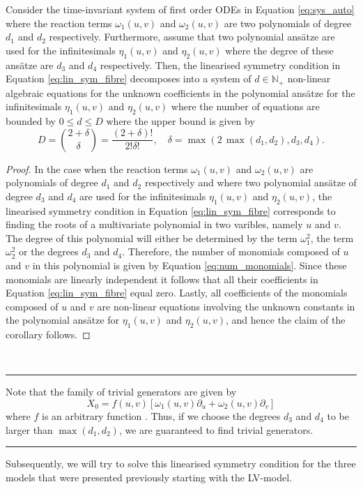 \begin{corollary}
  Consider the time-invariant system of first order ODEs in Equation \eqref{eq:sys_auto} where the reaction terms $\omega_1(u,v)$ and $\omega_2(u,v)$ are two polynomials of degree $d_1$ and $d_2$ respectively. Furthermore, assume that two polynomial ans\"atze are used for the infinitesimals $\eta_1(u,v)$ and $\eta_2(u,v)$ where the degree of these ans\"atze are $d_3$ and $d_4$ respectively. Then, the linearised symmetry condition in Equation \eqref{eq:lin_sym_fibre} decomposes into a system of $d\in\mathbb{N}_+$ non-linear algebraic equations for the unknown coefficients in the polynomial ans\"atze for the infinitesimals $\eta_1(u,v)$ and $\eta_2(u,v)$ where the number of equations are bounded by $0\leq d\leq D$ where the upper bound is given by
  \begin{equation}
    D={2+\delta\choose \delta}=\dfrac{(2+\delta)!}{2!\delta!},\quad\delta=\max\left(2\,\max\left(d_1,d_2\right),d_3,d_4\right).
    \label{eq:num_monomials}
    \end{equation}

\label{thm:lin_sym_cond_fibre_phase_plane_polynomial}
\end{corollary}
\dotfill
\begin{proof}
In the case when the reaction terms $\omega_1(u,v)$ and $\omega_2(u,v)$ are polynomials of degree $d_1$ and $d_2$ respectively and where two polynomial ans\"atze of degree $d_3$ and $d_4$ are used for the infinitesimals $\eta_1(u,v)$ and $\eta_2(u,v)$, the linearised symmetry condition in Equation \eqref{eq:lin_sym_fibre} corresponds to finding the roots of a multivariate polynomial in two varibles, namely $u$ and $v$. The degree of this polynomial will either be determined by the term $\omega_1^2$, the term $\omega_2^2$ or the degrees $d_3$ and $d_4$. Therefore, the number of monomials composed of $u$ and $v$ in this polynomial is given by Equation \eqref{eq:num_monomials}. Since these monomials are linearly independent it follows that all their coefficients in Equation \eqref{eq:lin_sym_fibre} equal zero. Lastly, all coefficients of the monomials composed of $u$ and $v$ are non-linear equations involving the unknown constants in the polynomial ans\"atze for $\eta_1(u,v)$ and $\eta_2(u,v)$, and hence the claim of the corollary follows.
\end{proof}
\dotfill\\
\hrule

\begin{remark}
  Note that the family of trivial generators are given by
  $$X_0=f(u,v)\left[\omega_1(u,v)\partial_u+\omega_2(u,v)\partial_v\right]$$
  where $f$ is an arbitrary function \cite{bluman1989symmetries}. Thus, if we choose the degrees $d_3$ and $d_4$ to be larger than $\max\left(d_1,d_2\right)$, we are guaranteed to find trivial generators.
\end{remark}
\hrule
\noindent $\;$\\Subsequently, we will try to solve this linearised symmetry condition for the three models that were presented previously starting with the LV-model. 